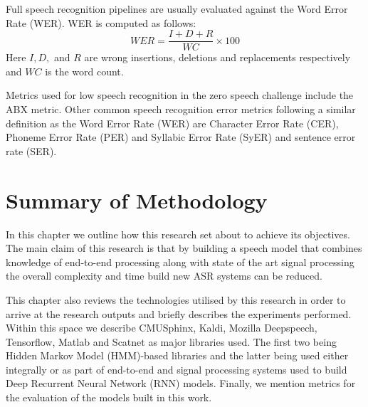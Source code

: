 Full speech recognition pipelines are usually evaluated against the Word Error Rate (WER).  WER is computed as follows:
\begin{equation}\label{eqn_2_3_wer}
WER=\frac{I+D+R}{WC}\times 100
\end{equation}
Here $I,D,$ and $R$ are wrong insertions, deletions and replacements respectively and $WC$ is the word count.

Metrics used for low speech recognition in the zero speech challenge \citep{versteegh2015zero} include the ABX metric. Other common speech recognition error metrics following a similar definition as the Word Error Rate (WER) are Character Error Rate (CER), Phoneme Error Rate (PER) and Syllabic Error Rate (SyER) and sentence error rate (SER).

\section{Summary of Methodology}
In this chapter we outline how this research set about to achieve its objectives.  The main claim of this research is that by building a speech model that combines knowledge of end-to-end processing along with state of the art signal processing the overall complexity and time build new ASR systems can be reduced.

This chapter also reviews the technologies utilised by this research in order to arrive at the research outputs and briefly describes the experiments performed.  Within this space we describe CMUSphinx, Kaldi, Mozilla Deepspeech, Tensorflow, Matlab and Scatnet as major libraries used.   The first two being Hidden Markov Model (HMM)-based libraries and the latter being used either integrally or as part of end-to-end  and signal processing systems used to build Deep Recurrent Neural Network (RNN) models. Finally, we mention metrics for the evaluation of the models built in this work.
